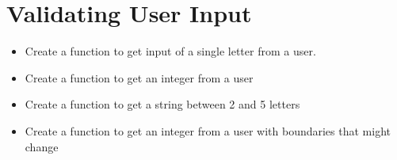 \documentclass[a4paper,12pt]{article}
\begin{document}
\section{Validating User Input}
\begin{itemize}
\item Create a function to get input of a single letter from a user.
\item  Create a function to get an integer from a user
\item Create a function to get a string between 2 and 5 letters
\item Create a function to get an integer from a user with boundaries that might change
\end{itemize}
\newpage
	\hypertarget{Lists}{}




\end{document}
